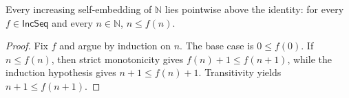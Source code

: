 \begin{lemma}
Every increasing self-embedding of $\mathbb N$ lies pointwise above the
identity: for every $f\in\mathsf{IncSeq}$ and every $n\in\mathbb N$,
$n\leq f(n)$.
\end{lemma}
\begin{proof}
Fix $f$ and argue by induction on $n$.  The base case is $0\leq f(0)$.
If $n\leq f(n)$, then strict monotonicity gives
$f(n)+1\leq f(n+1)$, while the induction hypothesis gives
$n+1\leq f(n)+1$.  Transitivity yields $n+1\leq f(n+1)$.
\end{proof}

